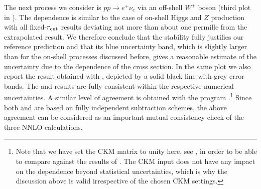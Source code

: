 \documentclass[english,11pt]{article}
\begin{document}
The next process we consider is $pp\rightarrow e^+\nu_e$ via an off-shell $W^+$ boson (third plot in ).  
The \rcut{} dependence is similar to the case of on-shell Higgs and $Z$ production with all fixed-$r_{\mathrm{cut}}$ results deviating not more 
than about one permille from the extrapolated result. 
We therefore conclude that the stability fully justifies our reference prediction and that its 
blue uncertainty band, which is slightly larger than for the on-shell processes discussed before, gives a 
reasonable estimate of the uncertainty due to the \rcut{} dependence of the 
cross section.
In the same plot we also report the result obtained with \FEWZ{} \cite{Gavin:2012sy},
depicted by a solid black line with grey error bands. The \Matrix{} and \FEWZ{} results are fully consistent within the respective numerical uncertainties.
A similar level of agreement is obtained with the program \NNLOjet{} \cite{Ridder:2016nkl}.\footnote{Note that we have set the CKM matrix to 
unity here, see , in order to be able to compare against the results of \NNLOjet{}. 
The CKM input does not have any impact on the \rcut{} dependence beyond statistical uncertainties, 
which is why the discussion above is valid irrespective of the chosen CKM settings.}
Since both \FEWZ{} and \NNLOjet{} are based on fully independent subtraction schemes, the above agreement can be
considered as an important mutual consistency check of the three NNLO calculations.
\end{document}
